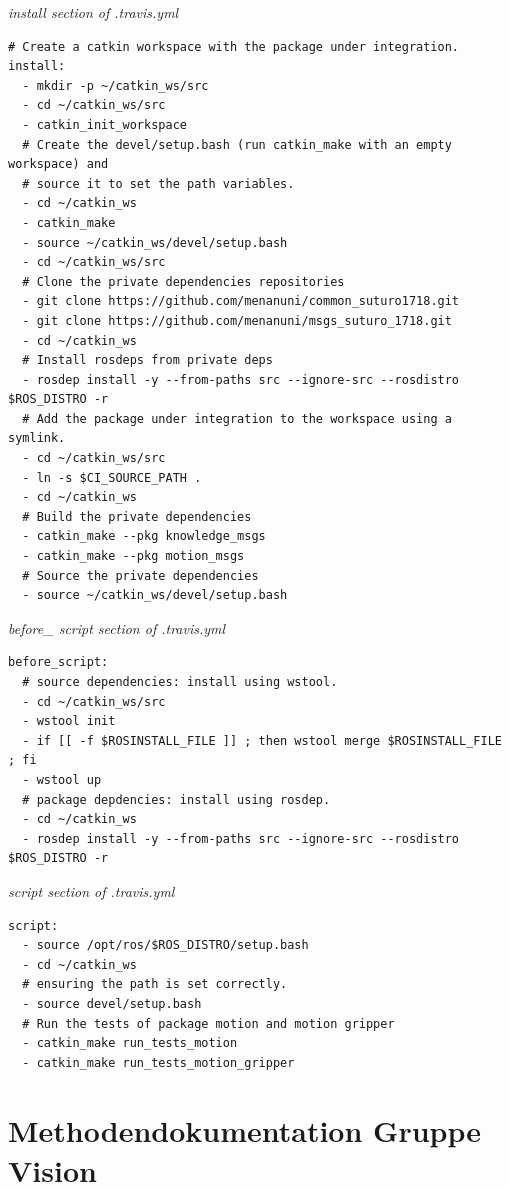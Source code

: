 \documentclass{suturo}
\begin{document}
\textit{install section of .travis.yml}
\begin{verbatim}
# Create a catkin workspace with the package under integration.
install:
  - mkdir -p ~/catkin_ws/src
  - cd ~/catkin_ws/src
  - catkin_init_workspace
  # Create the devel/setup.bash (run catkin_make with an empty workspace) and
  # source it to set the path variables.
  - cd ~/catkin_ws
  - catkin_make
  - source ~/catkin_ws/devel/setup.bash
  - cd ~/catkin_ws/src
  # Clone the private dependencies repositories
  - git clone https://github.com/menanuni/common_suturo1718.git
  - git clone https://github.com/menanuni/msgs_suturo_1718.git
  - cd ~/catkin_ws 
  # Install rosdeps from private deps
  - rosdep install -y --from-paths src --ignore-src --rosdistro $ROS_DISTRO -r
  # Add the package under integration to the workspace using a symlink.
  - cd ~/catkin_ws/src
  - ln -s $CI_SOURCE_PATH .
  - cd ~/catkin_ws
  # Build the private dependencies
  - catkin_make --pkg knowledge_msgs
  - catkin_make --pkg motion_msgs
  # Source the private dependencies
  - source ~/catkin_ws/devel/setup.bash
\end{verbatim}

\textit{before\_ script section of .travis.yml}

\begin{verbatim}
before_script:
  # source dependencies: install using wstool.
  - cd ~/catkin_ws/src
  - wstool init
  - if [[ -f $ROSINSTALL_FILE ]] ; then wstool merge $ROSINSTALL_FILE ; fi
  - wstool up
  # package depdencies: install using rosdep.
  - cd ~/catkin_ws
  - rosdep install -y --from-paths src --ignore-src --rosdistro $ROS_DISTRO -r

\end{verbatim}

\textit{script section of .travis.yml}

\begin{verbatim}
script:
  - source /opt/ros/$ROS_DISTRO/setup.bash
  - cd ~/catkin_ws
  # ensuring the path is set correctly.
  - source devel/setup.bash
  # Run the tests of package motion and motion gripper
  - catkin_make run_tests_motion
  - catkin_make run_tests_motion_gripper
\end{verbatim}

\newpage

\section*{Methodendokumentation Gruppe Vision}
\end{document}
